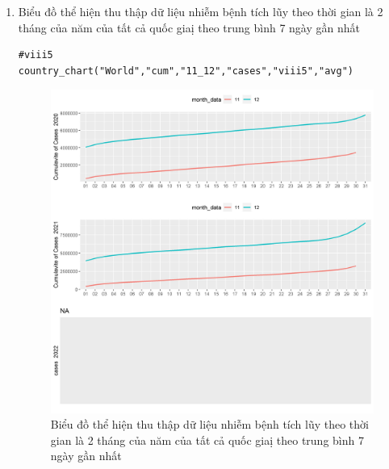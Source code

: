 \documentclass[a4paper]{article}
\theoremstyle{definition}
\begin{document}
\begin{enumerate}[i)]
\begin{enumerate}[1)]
    \item Biểu đồ thể hiện thu thập dữ liệu nhiễm bệnh tích lũy theo thời gian là 2 tháng của năm của tất cả quốc giaị theo trung bình 7 ngày gần nhất
    \begin{lstlisting}
#viii5
country_chart("World","cum","11_12","cases","viii5","avg")    
    \end{lstlisting}
    \begin{figure}[htp]
        \centering
		\includegraphics[scale = 0.7]{Images/VIII/viii5 World .jpeg} 
		\caption{Biểu đồ thể hiện thu thập dữ liệu nhiễm bệnh tích lũy theo thời gian là 2 tháng của năm của tất cả quốc giaị theo trung bình 7 ngày gần nhất}
		\label{fig:my_label}
	\end{figure}
	\newpage
	

\end{enumerate}
\end{enumerate}
\end{document}

